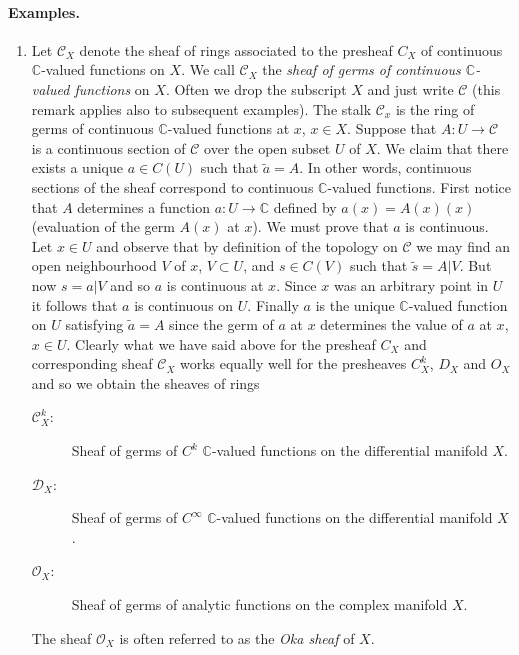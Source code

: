 \paragraph{Examples.}
\begin{enumerate}[start=9]
\item Let $\mathcal C_X$ denote the sheaf of rings associated to the presheaf $C_X$ of continuous $\mathbb C$-valued functions on $X$. We call $\mathcal C_X$ the \emph{sheaf of germs of continuous $\mathbb C$-valued functions} on $X$. Often we drop the subscript $X$ and just write $\mathcal C$ (this remark applies also to subsequent examples). The stalk $\mathcal C_x$ is the ring of germs of continuous $\mathbb C$-valued functions at $x$, $x\in X$. Suppose that $A:U\to\mathcal C$ is a continuous section of $\mathcal C$ over the open subset $U$ of $X$. We claim that there exists a unique $a\in C(U)$ such that $\widetilde a=A$. In other words, continuous sections of the sheaf correspond to continuous $\mathbb C$-valued functions. First notice that $A$ determines a function $a:U\to\mathbb C$ defined by $a(x)=A(x)(x)$ (evaluation of the germ $A(x)$ at $x$). We must prove that $a$ is continuous. Let $x\in U$ and observe that by definition of the topology on $\mathcal C$ we may find an open neighbourhood $V$ of $x$, $V\subset U$, and $s\in C(V)$ such that $\widetilde s=A|V$. But now $s=a|V$ and so $a$ is continuous at $x$. Since $x$ was an arbitrary point in $U$ it follows that $a$ is continuous on $U$. Finally $a$ is the unique $\mathbb C$-valued function on $U$ satisfying $\widetilde a=A$ since the germ of $a$ at $x$ determines the value of $a$ at $x$, $x\in U$. Clearly what we have said above for the presheaf $C_X$ and corresponding sheaf $\mathcal C_X$ works equally well for the presheaves $C_X^k$, $D_X$ and $O_X$ and so we obtain the sheaves of rings
\begin{description}
\item[$\mathcal C_X^k$:] Sheaf of germs of $C^k$ $\mathbb C$-valued functions on the differential manifold $X$.
\item[$\mathcal D_X$:] Sheaf of germs of $C^\infty$ $\mathbb C$-valued functions on the differential manifold $X$.
\item[$\mathcal O_X$:] Sheaf of germs of analytic functions on the complex manifold $X$.
\end{description}
The sheaf $\mathcal O_X$ is often referred to as the \emph{Oka sheaf} of $X$.


\end{enumerate}
